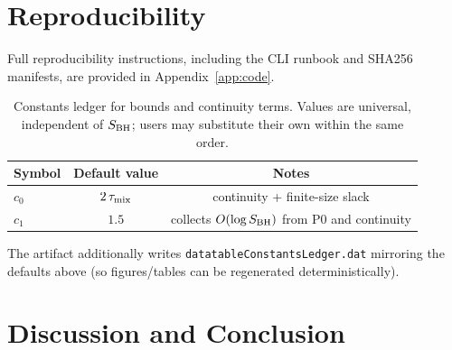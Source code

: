 \documentclass[11pt,a4paper]{article}
\theoremstyle{plain}
\theoremstyle{definition}
\theoremstyle{remark}
\begin{document}
\section*{Reproducibility}
Full reproducibility instructions, including the CLI runbook and SHA256 manifests, are provided in Appendix~\ref{app:code}.

\begin{table}[t]
\centering
\caption{Constants ledger for bounds and continuity terms.  Values are universal,
independent of $S_{\rm BH}$; users may substitute their own within the same order.}
\label{tab:constants-ledger}
\begin{tabular}{lcc}
\toprule
Symbol & Default value & Notes \\
\midrule
$c_0$ & $2\,\tau_{\rm mix}$ & continuity + finite-size slack \\
$c_1$ & $1.5$               & collects $O(\log S_{\rm BH})$ from P0 and continuity \\
\bottomrule
\end{tabular}
\end{table}

The artifact additionally writes \texttt{datatableConstantsLedger.dat} mirroring
the defaults above (so figures/tables can be regenerated deterministically).

\section{Discussion and Conclusion}
\label{sec:conclusion}
\end{document}
